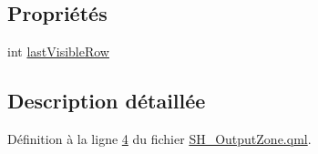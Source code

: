 \subsection*{Propriétés}
\begin{DoxyCompactItemize}
\item 
int \hyperlink{classSH__OutputZone_ae324bcdd20ad4a9e435678d045964dc9}{last\-Visible\-Row}
\end{DoxyCompactItemize}


\subsection{Description détaillée}


Définition à la ligne \hyperlink{SH__OutputZone_8qml_source_l00004}{4} du fichier \hyperlink{SH__OutputZone_8qml_source}{S\-H\-\_\-\-Output\-Zone.\-qml}.



